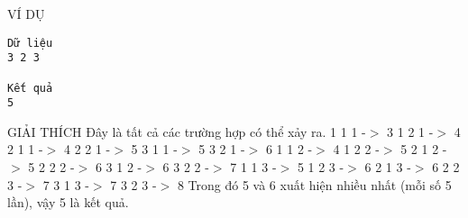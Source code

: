 VÍ DỤ  
\begin{verbatim}
Dữ liệu
3 2 3

Kết quả
5
\end{verbatim}
   GIẢI THÍCH  
Đây là tất cả các trường hợp có thể xảy ra. 1 1 1 -$>$ 3  1 2 1 -$>$ 4  2 1 1 -$>$ 4  2 2 1 -$>$ 5  3 1 1 -$>$ 5  3 2 1 -$>$ 6 1 1 2 -$>$ 4  1 2 2 -$>$ 5  2 1 2 -$>$ 5  2 2 2 -$>$ 6  3 1 2 -$>$ 6  3 2 2 -$>$ 7 1 1 3 -$>$ 5  1 2 3 -$>$ 6  2 1 3 -$>$ 6  2 2 3 -$>$ 7  3 1 3 -$>$ 7  3 2 3 -$>$ 8 Trong đó 5 và 6 xuất hiện nhiều nhất (mỗi số 5 lần), vậy 5 là kết quả.
